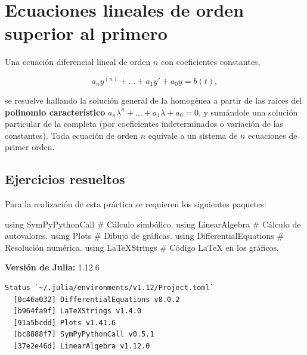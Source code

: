 \documentclass[
  spanish,
  a4paper,
]{scrreport}
\newenvironment{Shaded}{\begin{snugshade}}{\end{snugshade}}
\newcommand{\BuiltInTok}[1]{\textcolor[rgb]{0.00,0.23,0.31}{#1}}
\newcommand{\CommentTok}[1]{\textcolor[rgb]{0.37,0.37,0.37}{#1}}
\newcommand{\ImportTok}[1]{\textcolor[rgb]{0.00,0.46,0.62}{#1}}
\theoremstyle{definition}
\theoremstyle{remark}
\begin{document}

\chapter{Ecuaciones lineales de orden superior al
primero}\label{ecuaciones-lineales-de-orden-superior-al-primero}

Una ecuación diferencial lineal de orden \(n\) con coeficientes
constantes,

\[
a_n y^{(n)} + \dots + a_1 y' + a_0 y = b(t),
\]

se resuelve hallando la solución general de la homogénea a partir de las
raíces del \textbf{polinomio característico}
\(a_n\lambda^n + \dots + a_1\lambda + a_0 = 0\), y sumándole una
solución particular de la completa (por coeficientes indeterminados o
variación de las constantes). Toda ecuación de orden \(n\) equivale a un
sistema de \(n\) ecuaciones de primer orden.

\section{Ejercicios resueltos}\label{ejercicios-resueltos-3}

Para la realización de esta práctica se requieren los siguientes
paquetes:

\begin{Shaded}
\begin{Highlighting}[]
\ImportTok{using} \BuiltInTok{SymPyPythonCall}        \CommentTok{\# Cálculo simbólico.}
\ImportTok{using} \BuiltInTok{LinearAlgebra}          \CommentTok{\# Cálculo de autovalores.}
\ImportTok{using} \BuiltInTok{Plots}                  \CommentTok{\# Dibujo de gráficas.}
\ImportTok{using} \BuiltInTok{DifferentialEquations}  \CommentTok{\# Resolución numérica.}
\ImportTok{using} \BuiltInTok{LaTeXStrings}           \CommentTok{\# Código LaTeX en los gráficos.}
\end{Highlighting}
\end{Shaded}

\begin{tcolorbox}[enhanced jigsaw, arc=.35mm, bottomrule=.15mm, bottomtitle=1mm, breakable, colback=white, colbacktitle=quarto-callout-note-color!10!white, colframe=quarto-callout-note-color-frame, coltitle=black, left=2mm, leftrule=.75mm, opacityback=0, opacitybacktitle=0.6, rightrule=.15mm, title=\textcolor{quarto-callout-note-color}{\faInfo}\hspace{0.5em}{Versiones de Julia y de los paquetes utilizados}, titlerule=0mm, toprule=.15mm, toptitle=1mm]

\textbf{Versión de Julia:} 1.12.6

\begin{verbatim}
Status `~/.julia/environments/v1.12/Project.toml`
  [0c46a032] DifferentialEquations v8.0.2
  [b964fa9f] LaTeXStrings v1.4.0
  [91a5bcdd] Plots v1.41.6
  [bc8888f7] SymPyPythonCall v0.5.1
  [37e2e46d] LinearAlgebra v1.12.0
\end{verbatim}

\end{tcolorbox}
\end{document}
